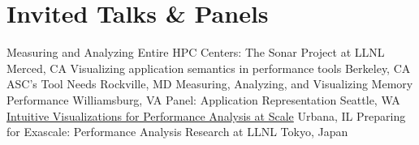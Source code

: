 \section{Invited Talks \& Panels}
\iftoggle{grant}{
}{
	\cventry{February 26, 2016}{Tokyo Institute of Technology}
		{\newline Measuring and Analyzing Entire HPC Centers: The Sonar Project at LLNL}
		{Tokyo, Japan}{}{}	
}
		{\newline Measuring and Analyzing Entire HPC Centers: The Sonar Project at LLNL}
		{Merced, CA}{}{}
		{\newline Visualizing application semantics in performance tools}
		{Berkeley, CA}{}{}
		{\newline ASC's Tool Needs}
		{Rockville, MD}
		{}{}
		{\newline Measuring, Analyzing, and Visualizing Memory Performance}
		{Williamsburg, VA}
		{}{}
		{\newline Panel: Application Representation}
		{Seattle, WA}
		{}{}
		{\href{https://www.youtube.com/watch?v=8rJ4231hq9g}
		{\newline Intuitive Visualizations for Performance Analysis at Scale}}
		{Urbana, IL}
		{}{}%
		{\newline Preparing for Exascale: Performance Analysis Research at LLNL}
		{Tokyo, Japan}{}{}
